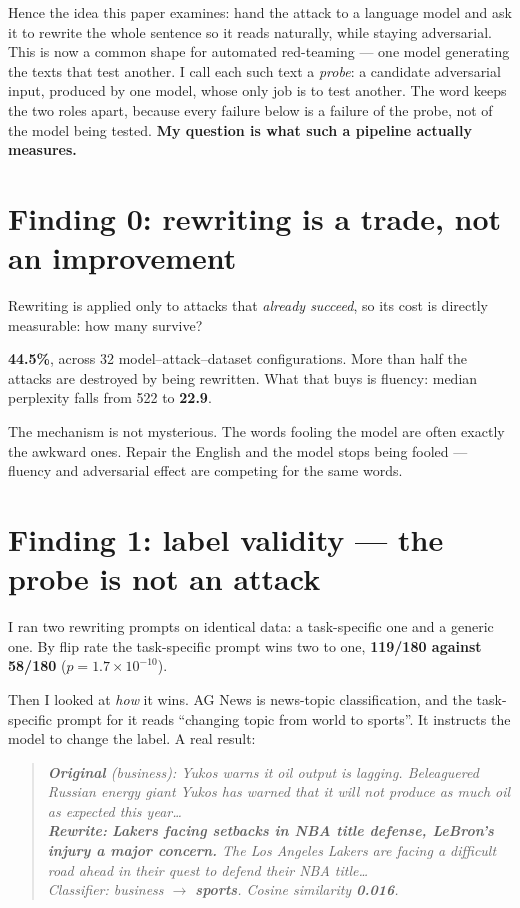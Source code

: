 \documentclass[11pt]{article}
\newenvironment{ex}{\begin{quote}\small\it}{\end{quote}}
\begin{document}
Hence the idea this paper examines: hand the attack to a language model and ask it
to rewrite the whole sentence so it reads naturally, while staying adversarial.
This is now a common shape for automated red-teaming --- one model generating the
texts that test another. I call each such text a \emph{probe}: a candidate
adversarial input, produced by one model, whose only job is to test another. The
word keeps the two roles apart, because every failure below is a failure of the
probe, not of the model being tested. \textbf{My question is what such a pipeline
actually measures.}

\section*{Finding 0: rewriting is a trade, not an improvement}

Rewriting is applied only to attacks that \emph{already succeed}, so its cost is
directly measurable: how many survive?

\textbf{44.5\%}, across 32 model--attack--dataset configurations. More than half
the attacks are destroyed by being rewritten. What that buys is fluency: median
perplexity falls from 522 to \textbf{22.9}.

The mechanism is not mysterious. The words fooling the model are often exactly the
awkward ones. Repair the English and the model stops being fooled --- fluency and
adversarial effect are competing for the same words.

\section*{Finding 1: label validity --- the probe is not an attack}

I ran two rewriting prompts on identical data: a task-specific one and a generic
one. By flip rate the task-specific prompt wins two to one, \textbf{119/180 against
58/180} ($p = 1.7\times10^{-10}$).

Then I looked at \emph{how} it wins. AG News is news-topic classification, and the
task-specific prompt for it reads ``changing topic from world to sports''. It
instructs the model to change the label. A real result:

\begin{ex}
\textbf{Original} (business): Yukos warns it oil output is lagging. Beleaguered
Russian energy giant Yukos has warned that it will not produce as much oil as
expected this year\ldots\\[3pt]
\textbf{Rewrite:} \textbf{Lakers facing setbacks in NBA title defense, LeBron's
injury a major concern.} The Los Angeles Lakers are facing a difficult road ahead
in their quest to defend their NBA title\ldots\\[3pt]
Classifier: business $\rightarrow$ \textbf{sports}. Cosine similarity \textbf{0.016}.
\end{ex}
\end{document}

